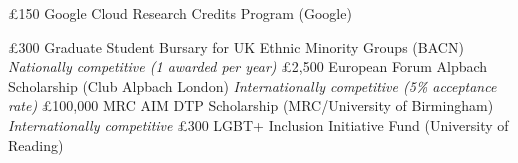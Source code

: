 {%
	£150}
{%
	Google Cloud Research Credits Program (Google)}
{}
\vspace{1em}

{%
	£300}
{%
	Graduate Student Bursary for UK Ethnic Minority Groups (BACN)}
{}
{\small\textit{Nationally competitive (1 awarded per year)}}
\vspace{1em}
\datedsubsectionnarrow{}
{%
	£2,500}
{%
	European Forum Alpbach Scholarship  (Club Alpbach London)}
{}
{\small\textit{Internationally competitive (5\% acceptance rate)}}
\vspace{1em}
{%
	£100,000}
{%
	MRC AIM DTP Scholarship (MRC/University of Birmingham)}
{}
{\small\textit{Internationally competitive}}
\vspace{1em}
\datedsubsectionnarrow{}
{%
	£300}
{%
	LGBT+ Inclusion Initiative Fund (University of Reading)}
{}